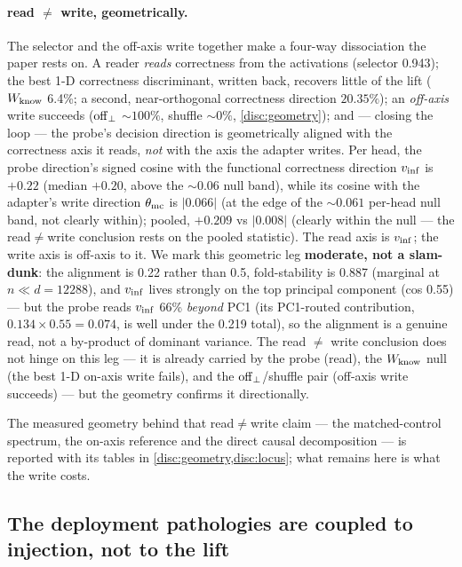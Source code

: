\paragraph{read ${\neq}$ write, geometrically.}
The selector and the off-axis write together make a four-way dissociation the paper
rests on. A reader \emph{reads} correctness from the activations (selector 0.943);
the best 1-D correctness discriminant, written back, recovers little of the lift
($W_{\mathrm{know}}$ 6.4\%; a second, near-orthogonal correctness direction $20.35\%$); an
\emph{off-axis} write succeeds ($\mathrm{off}_{\perp}$ ${\sim}100\%$, shuffle ${\sim}0\%$,
\cref{disc:geometry}); and --- closing the loop --- the probe's decision direction
is geometrically aligned with the correctness axis it reads, \emph{not} with the
axis the adapter writes. Per head, the probe direction's signed cosine with the
functional correctness direction $v_{\mathrm{inf}}$ is $+0.22$ (median $+0.20$, above the
${\sim}0.06$ null band), while its cosine with the adapter's write direction
$\theta_{\mathrm{mc}}$ is $|0.066|$ (at the edge of the ${\sim}0.061$ per-head null band, not
clearly within); pooled, $+0.209$ vs $|0.008|$ (clearly within the null --- the
read${\neq}$write conclusion rests on the pooled statistic). The read axis is
$v_{\mathrm{inf}}$; the write axis is off-axis to it. We mark this geometric leg
\textbf{moderate, not a slam-dunk}: the alignment is 0.22 rather than 0.5,
fold-stability is 0.887 (marginal at $n \ll d = 12288$), and $v_{\mathrm{inf}}$ lives strongly
on the top principal component (cos 0.55) --- but the probe reads $v_{\mathrm{inf}}$ 66\%
\emph{beyond} PC1 (its PC1-routed contribution, $0.134 \times 0.55 = 0.074$, is
well under the 0.219 total), so the alignment is a genuine read, not a by-product
of dominant variance. The read ${\neq}$ write conclusion does not hinge on this leg
--- it is already carried by the probe (read), the $W_{\mathrm{know}}$ null (the best 1-D
on-axis write fails), and the $\mathrm{off}_{\perp}$/shuffle pair (off-axis write succeeds) --- but the
geometry confirms it directionally.

The measured geometry behind that read${\neq}$write claim --- the matched-control
spectrum, the on-axis reference and the direct causal decomposition --- is reported
with its tables in \cref{disc:geometry,disc:locus}; what remains here is what the
write costs.

\subsection{The deployment pathologies are coupled to injection, not to the lift}
\label{disc:pathologies}

